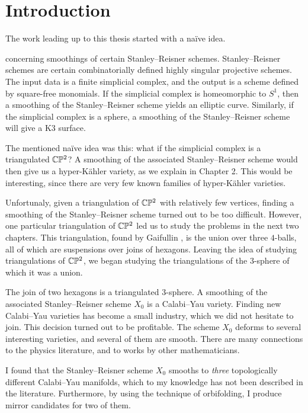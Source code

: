 \chapter{Introduction}
\label{sec:intro}

The work leading up to this thesis started with a naïve idea.

 concerning smoothings of certain Stanley--Reisner schemes. Stanley--Reisner schemes are certain combinatorially defined highly singular projective schemes. The input data is a finite simplicial complex, and the output is a scheme defined by square-free monomials. If the simplicial complex is homeomorphic to $S^1$, then a smoothing of the Stanley--Reisner scheme yields an elliptic curve. Similarly, if the simplicial complex is a sphere, a smoothing of the Stanley--Reisner scheme will give a K3 surface.

The mentioned naïve idea was this: what if the simplicial complex is a triangulated $\mathbb{C} \mathbb{P}^2$? A smoothing of the associated Stanley--Reisner scheme would then give us a hyper-Kähler variety, as we explain in Chapter 2. This would be interesting, since there are very few known families of hyper-Kähler varieties.

Unfortunaly, given a triangulation of $\mathbb{C} \mathbb{P}^2$ with relatively few vertices, finding a smoothing of the Stanley--Reisner scheme turned out to be too difficult. However, one particular triangulation of $\mathbb{C} \mathbb{P}^2$ led us to study the problems in the next two chapters. This triangulation, found by Gaifullin \cite{cp2_15_chess}, is the union over three $4$-balls, all of which are suspensions over joins of hexagons. Leaving the idea of studying triangulations of $\mathbb{C} \mathbb{P}^2$, we began studying the triangulations of the $3$-sphere of which it was a union.

The join of two hexagons is a triangulated $3$-sphere. A smoothing of the associated Stanley--Reisner scheme $X_0$ is a Calabi--Yau variety. Finding new Calabi--Yau varieties has become a small industry, which we did not hesitate to join. This decision turned out to be profitable. The scheme $X_0$ deforms to several interesting varieties, and several of them are smooth. There are many connections to the physics literature, and to works by other mathematicians.

I found that the Stanley--Reisner scheme $X_0$ smooths to \emph{three} topologically different Calabi--Yau manifolds, which to my knowledge has not been described in the literature. Furthermore, by using the technique of orbifolding, I produce mirror candidates for two of them.

